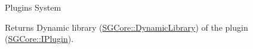 Plugins System \begin{DoxyReturn}{Returns}
Dynamic library (\mbox{\hyperlink{structSGCore_1_1DynamicLibrary}{SGCore\+::\+Dynamic\+Library}}) of the plugin (\mbox{\hyperlink{structSGCore_1_1IPlugin}{SGCore\+::\+IPlugin}}). 
\end{DoxyReturn}
